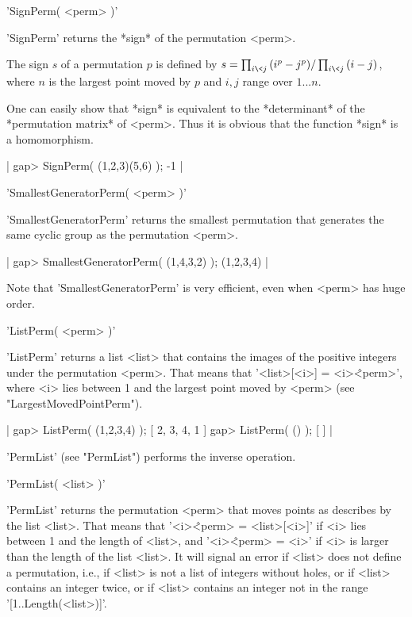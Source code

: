 
'SignPerm( <perm> )'

'SignPerm' returns the *sign* of the permutation <perm>.

The sign $s$ of a permutation $p$ is defined by
$s = \prod_{i \< j}{(i^p - j^p)} / \prod_{i \< j}{(i - j)}$,
where $n$ is the largest point moved by $p$ and $i,j$ range over $1...n$.

One can easily show that *sign* is equivalent to the *determinant* of the
*permutation  matrix* of <perm>.  Thus  it   is obvious that the function
*sign* is a homomorphism.

|    gap> SignPerm( (1,2,3)(5,6) );
    -1 |


'SmallestGeneratorPerm( <perm> )'

'SmallestGeneratorPerm' returns  the smallest permutation that  generates
the same cyclic group as the permutation <perm>.

|    gap> SmallestGeneratorPerm( (1,4,3,2) );
    (1,2,3,4) |

Note that 'SmallestGeneratorPerm' is very efficient, even when <perm> has
huge order.


'ListPerm( <perm> )'

'ListPerm' returns a list <list> that contains the images of the positive
integers  under the permutation <perm>.   That means  that '<list>[<i>] =
<i>\^<perm>',  where  <i> lies between 1 and  the largest  point moved by
<perm> (see "LargestMovedPointPerm").

|    gap> ListPerm( (1,2,3,4) );
    [ 2, 3, 4, 1 ]
    gap> ListPerm( () );
    [  ] |

'PermList' (see "PermList") performs the inverse operation.


'PermList( <list> )'

'PermList' returns the permutation <perm> that moves  points as describes
by the list  <list>.  That  means that '<i>\^<perm> = <list>[<i>]' if <i>
lies between 1 and the length of <list>, and  '<i>\^<perm> = <i>' if  <i>
is larger than the length of the list <list>.  It will signal an error if
<list> does not define a permutation,  i.e.,  if <list> is not a list  of
integers without holes,  or if <list>  contains  an integer  twice, or if
<list> contains an integer not in the range '[1..Length(<list>)]'.

